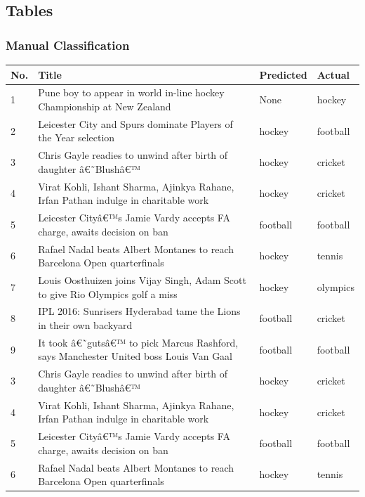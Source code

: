 \documentclass[12pt]{article}
\begin{document}
\subsection{Tables}
\subsubsection{Manual Classification}
\begin{longtable}{ |p{2.0cm} | p{10.0cm} | p{2.0cm} |p{2.0cm}| }\hline
\textbf{No.} & \textbf{Title} & \textbf{Predicted} & \textbf{Actual} \\\hline
1 &  Pune boy to appear in world in-line hockey Championship at New Zealand  & None & hockey \\\hline										
2 &  Leicester City and Spurs dominate Players of the Year selection  & hockey & football \\\hline										
3 &  Chris Gayle readies to unwind after birth of daughter â€˜Blushâ€™ & hockey & cricket \\\hline										
4 &  Virat Kohli, Ishant Sharma, Ajinkya Rahane, Irfan Pathan indulge in charitable work & hockey & cricket \\\hline										
5 &  Leicester Cityâ€™s Jamie Vardy accepts FA charge, awaits decision on ban & football & football \\\hline										
6 &  Rafael Nadal beats Albert Montanes to reach Barcelona Open quarterfinals & hockey & tennis \\\hline										
7 &  Louis Oosthuizen joins Vijay Singh, Adam Scott to give Rio Olympics golf a miss & hockey & olympics \\\hline										
8 &  IPL 2016: Sunrisers Hyderabad tame the Lions in their own backyard & football & cricket \\\hline										
9 &  It took â€˜gutsâ€™ to pick Marcus Rashford, says Manchester United boss Louis Van Gaal & football & football \\\hline										
3 &  Chris Gayle readies to unwind after birth of daughter â€˜Blushâ€™ & hockey & cricket \\\hline										
4 &  Virat Kohli, Ishant Sharma, Ajinkya Rahane, Irfan Pathan indulge in charitable work & hockey & cricket \\\hline										
5 &  Leicester Cityâ€™s Jamie Vardy accepts FA charge, awaits decision on ban & football & football \\\hline										
6 &  Rafael Nadal beats Albert Montanes to reach Barcelona Open quarterfinals & hockey & tennis \\\hline										

\end{longtable}
\end{document}
